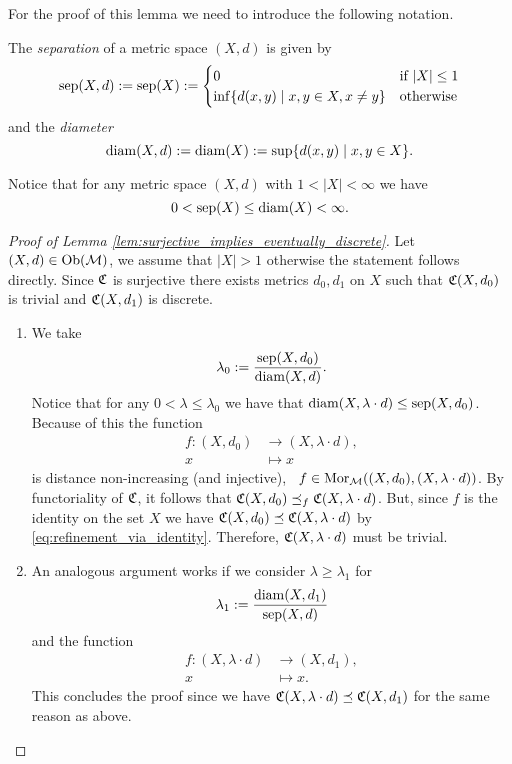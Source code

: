 For the proof of this lemma we need to introduce the following notation.

\begin{definition}{}{}
    The \emph{separation} of a metric space $(X,d)$ is given by
    \begin{equation*}
    \mathrm{sep}(X,d) := \mathrm{sep}(X) := \begin{cases}
        0 & \text{if } |X| \le 1\\
        \inf\{d(x,y) \mid x,y \in X, x \neq y\} & \text{otherwise}
    \end{cases}
    \end{equation*}
    and the \emph{diameter}
    \begin{equation*}
    \mathrm{diam}(X,d) := \mathrm{diam}(X) := \sup\{d(x,y) \mid x,y \in X\}.
    \end{equation*}
\end{definition}

Notice that for any metric space $(X,d)$ with $1 < |X| < \infty$ we have
$$
0 < \mathrm{sep}(X) \leq \mathrm{diam}(X) < \infty.
$$

\begin{proof}[Proof of Lemma \ref{lem:surjective_implies_eventually_discrete}]
    Let $(X,d) \in \mathrm {Ob}(\mathcal{M})$, we assume that $|X| > 1$ otherwise the statement follows directly. Since $\mathfrak{C}$ is surjective there exists metrics $d_0, d_1$ on $X$ such that $\mathfrak{C}(X,d_0)$ is trivial and $\mathfrak{C}(X,d_1)$ is discrete.
    \begin{enumerate}
        \item We take
        $$
        \lambda_0 := \frac{\mathrm{sep}(X,d_0)}{\mathrm{diam}(X,d)}.
        $$ 
        Notice that for any $0 < \lambda \le \lambda_0$ we have that $\mathrm{diam}(X,\lambda \cdot d) \le \mathrm{sep}(X,d_0)$. Because of this the function
        \begin{align*}
            f: (X, d_0) &\longrightarrow (X, \lambda \cdot d),\\
            x &\longmapsto x
        \end{align*}
        is distance non-increasing (and injective), \ie\ $f \in \mathrm {Mor}_{\mathcal{M}}((X,d_0), (X,\lambda \cdot d))$.
        By functoriality of $\mathfrak{C}$, it follows that $\mathfrak{C}(X,d_0) \preceq_f \mathfrak{C}(X,\lambda \cdot d)$. But, since $f$ is the identity on the set $X$ we have $\mathfrak{C}(X,d_0) \preceq \mathfrak{C}(X,\lambda \cdot d)$ by \eqref{eq:refinement_via_identity}. Therefore, $\mathfrak{C}(X,\lambda \cdot d)$ must be trivial.

        \item An analogous argument works if we consider $\lambda \ge \lambda_1$ for
        $$
        \lambda_1 := \frac{\mathrm{diam}(X,d_1)}{\mathrm{sep}(X,d)}
        $$
        and the function
        \begin{align*}
            f: (X, \lambda \cdot d) &\longrightarrow (X, d_1),\\
            x &\longmapsto x.
        \end{align*}
        This concludes the proof since we have $\mathfrak{C}(X,\lambda \cdot d) \preceq \mathfrak{C}(X,d_1)$ for the same reason as above.
    \end{enumerate}
\end{proof}

